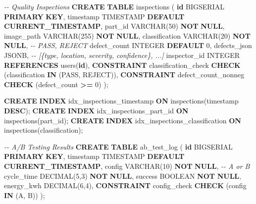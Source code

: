 \documentclass[
]{article}
\newenvironment{Shaded}{\begin{snugshade}}{\end{snugshade}}
\newcommand{\CommentTok}[1]{\textcolor[rgb]{0.56,0.35,0.01}{\textit{#1}}}
\newcommand{\DataTypeTok}[1]{\textcolor[rgb]{0.13,0.29,0.53}{#1}}
\newcommand{\DecValTok}[1]{\textcolor[rgb]{0.00,0.00,0.81}{#1}}
\newcommand{\FunctionTok}[1]{\textcolor[rgb]{0.13,0.29,0.53}{\textbf{#1}}}
\newcommand{\KeywordTok}[1]{\textcolor[rgb]{0.13,0.29,0.53}{\textbf{#1}}}
\newcommand{\NormalTok}[1]{#1}
\newcommand{\OperatorTok}[1]{\textcolor[rgb]{0.81,0.36,0.00}{\textbf{#1}}}
\newcommand{\StringTok}[1]{\textcolor[rgb]{0.31,0.60,0.02}{#1}}
\begin{document}
\begin{Shaded}
\begin{Highlighting}[]
\CommentTok{{-}{-} Quality Inspections}
\KeywordTok{CREATE} \KeywordTok{TABLE}\NormalTok{ inspections (}
    \KeywordTok{id}\NormalTok{ BIGSERIAL }\KeywordTok{PRIMARY} \KeywordTok{KEY}\NormalTok{,}
    \DataTypeTok{timestamp} \DataTypeTok{TIMESTAMP} \KeywordTok{DEFAULT} \FunctionTok{CURRENT\_TIMESTAMP}\NormalTok{,}
\NormalTok{    part\_id }\DataTypeTok{VARCHAR}\NormalTok{(}\DecValTok{50}\NormalTok{) }\KeywordTok{NOT} \KeywordTok{NULL}\NormalTok{,}
\NormalTok{    image\_path }\DataTypeTok{VARCHAR}\NormalTok{(}\DecValTok{255}\NormalTok{) }\KeywordTok{NOT} \KeywordTok{NULL}\NormalTok{,}
\NormalTok{    classification }\DataTypeTok{VARCHAR}\NormalTok{(}\DecValTok{20}\NormalTok{) }\KeywordTok{NOT} \KeywordTok{NULL}\NormalTok{,  }\CommentTok{{-}{-} PASS, REJECT}
\NormalTok{    defect\_count }\DataTypeTok{INTEGER} \KeywordTok{DEFAULT} \DecValTok{0}\NormalTok{,}
\NormalTok{    defects\_json JSONB,  }\CommentTok{{-}{-} [\{type, location, severity, confidence\}, ...]}
\NormalTok{    inspector\_id }\DataTypeTok{INTEGER} \KeywordTok{REFERENCES}\NormalTok{ users(}\KeywordTok{id}\NormalTok{),}
    \KeywordTok{CONSTRAINT}\NormalTok{ classification\_check }\KeywordTok{CHECK}\NormalTok{ (classification }\KeywordTok{IN}\NormalTok{ (}\StringTok{\textquotesingle{}PASS\textquotesingle{}}\NormalTok{, }\StringTok{\textquotesingle{}REJECT\textquotesingle{}}\NormalTok{)),}
    \KeywordTok{CONSTRAINT}\NormalTok{ defect\_count\_nonneg }\KeywordTok{CHECK}\NormalTok{ (defect\_count }\OperatorTok{\textgreater{}=} \DecValTok{0}\NormalTok{)}
\NormalTok{);}

\KeywordTok{CREATE} \KeywordTok{INDEX}\NormalTok{ idx\_inspections\_timestamp }\KeywordTok{ON}\NormalTok{ inspections(}\DataTypeTok{timestamp} \KeywordTok{DESC}\NormalTok{);}
\KeywordTok{CREATE} \KeywordTok{INDEX}\NormalTok{ idx\_inspections\_part\_id }\KeywordTok{ON}\NormalTok{ inspections(part\_id);}
\KeywordTok{CREATE} \KeywordTok{INDEX}\NormalTok{ idx\_inspections\_classification }\KeywordTok{ON}\NormalTok{ inspections(classification);}

\CommentTok{{-}{-} A/B Testing Results}
\KeywordTok{CREATE} \KeywordTok{TABLE}\NormalTok{ ab\_test\_log (}
    \KeywordTok{id}\NormalTok{ BIGSERIAL }\KeywordTok{PRIMARY} \KeywordTok{KEY}\NormalTok{,}
    \DataTypeTok{timestamp} \DataTypeTok{TIMESTAMP} \KeywordTok{DEFAULT} \FunctionTok{CURRENT\_TIMESTAMP}\NormalTok{,}
\NormalTok{    config }\DataTypeTok{VARCHAR}\NormalTok{(}\DecValTok{10}\NormalTok{) }\KeywordTok{NOT} \KeywordTok{NULL}\NormalTok{,  }\CommentTok{{-}{-} \textquotesingle{}A\textquotesingle{} or \textquotesingle{}B\textquotesingle{}}
\NormalTok{    cycle\_time }\DataTypeTok{DECIMAL}\NormalTok{(}\DecValTok{5}\NormalTok{,}\DecValTok{3}\NormalTok{) }\KeywordTok{NOT} \KeywordTok{NULL}\NormalTok{,}
\NormalTok{    success }\DataTypeTok{BOOLEAN} \KeywordTok{NOT} \KeywordTok{NULL}\NormalTok{,}
\NormalTok{    energy\_kwh }\DataTypeTok{DECIMAL}\NormalTok{(}\DecValTok{6}\NormalTok{,}\DecValTok{4}\NormalTok{),}
    \KeywordTok{CONSTRAINT}\NormalTok{ config\_check }\KeywordTok{CHECK}\NormalTok{ (config }\KeywordTok{IN}\NormalTok{ (}\StringTok{\textquotesingle{}A\textquotesingle{}}\NormalTok{, }\StringTok{\textquotesingle{}B\textquotesingle{}}\NormalTok{))}
\NormalTok{);}


\end{Highlighting}
\end{Shaded}
\end{document}
